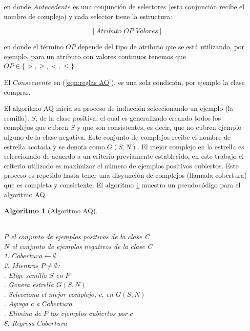 \documentclass[12pt]{report}
\theoremstyle{break}
\theoremstyle{break}
\newtheorem{algoritmo}{Algoritmo}[chapter]
\begin{document}
en donde $Antecedente$ es una conjunción de selectores (esta conjunción recibe el nombre de complejo) y cada selector tiene la estructura:

\begin{equation} \label{eqn:condicion AQ}
\left[Atributo\,\, OP\,\, Valores \right]
\end{equation}

en donde el término $OP$ depende del tipo de atributo que se está utilizando, por ejemplo, para un atributo con valores continuos tenemos que $OP \in \{>, \geq, <, \leq\}$.

El $Consecuente$ en (\ref{eqn:reglas AQ}), es una sola condición, por ejemplo la clase comprar.

El algoritmo AQ inicia su proceso de inducción seleccionando un ejemplo (la semilla), $S$, de la clase positiva, el cual es generalizado creando todos los complejos que cubren $S$ y que son consistentes, es decir, que no cubren ejemplo alguno de la clase negativa. Este conjunto de complejos recibe el nombre de estrella acotada y se denota como $G(S,N)$. El mejor complejo en la estrella es seleccionado de acuerdo a un criterio previamente establecido, en este trabajo el criterio utilizado es maximizar el número de ejemplos positivos cubiertos. Este proceso es repetido hasta tener una disyunción de complejos (llamada cobertura) que es completa y consistente. El algoritmo \ref{algo:AQ} muestra un pseudocódigo para el algoritmo AQ.

\begin{algoritmo}[Algoritmo AQ]
\begin{tabbing}
\\$P$ el conjunto de ejemplos positivos de la clase C
\\$N$ el conjunto de ejemplos negativos de la clase C\\
1. \=$Cobertura\leftarrow \emptyset $ \\
2. Mientras $P \neq \emptyset$:\\
 . Elige semilla $S$ en $P$\\
 . Genera estrella $G(S,N)$\\
 . Selecciona el mejor complejo, $c$, en $G(S,N)$\\
 . Agrega $c$ a $Cobertura$\\
 . Elimina de $P$ los ejemplos cubiertos por $c$\\
\=8. Regresa $Cobertura$
\end{tabbing}
\label{algo:AQ}
\end{algoritmo}
\end{document}

